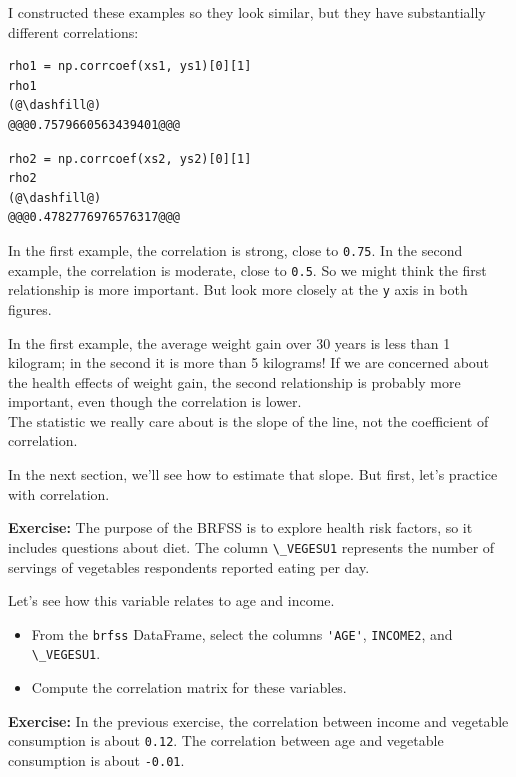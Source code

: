 I constructed these examples so they look similar, but they have
substantially different correlations:

\begin{lstlisting}[]
rho1 = np.corrcoef(xs1, ys1)[0][1]
rho1
(@\dashfill@)
@@@0.7579660563439401@@@
\end{lstlisting}

\begin{lstlisting}[]
rho2 = np.corrcoef(xs2, ys2)[0][1]
rho2
(@\dashfill@)
@@@0.4782776976576317@@@
\end{lstlisting}

In the first example, the correlation is strong, close to
\passthrough{\lstinline!0.75!}. In the second example, the correlation
is moderate, close to \passthrough{\lstinline!0.5!}. So we might think
the first relationship is more important. But look more closely at the
\passthrough{\lstinline!y!} axis in both figures.

In the first example, the average weight gain over 30 years is less than
1 kilogram; in the second it is more than 5 kilograms! If we are
concerned about the health effects of weight gain, the second
relationship is probably more important, even though the correlation is
lower.\\
The statistic we really care about is the slope of the line, not the
coefficient of correlation.

In the next section, we'll see how to estimate that slope. But first,
let's practice with correlation.

\textbf{Exercise:} The purpose of the BRFSS is to explore health risk
factors, so it includes questions about diet. The column
\passthrough{\lstinline!\_VEGESU1!} represents the number of servings of
vegetables respondents reported eating per day.

Let's see how this variable relates to age and income.

\begin{itemize}

\item
  From the \passthrough{\lstinline!brfss!} DataFrame, select the columns
  \passthrough{\lstinline!'AGE'!}, \passthrough{\lstinline!INCOME2!},
  and \passthrough{\lstinline!\_VEGESU1!}.
\item
  Compute the correlation matrix for these variables.
\end{itemize}

\textbf{Exercise:} In the previous exercise, the correlation between
income and vegetable consumption is about
\passthrough{\lstinline!0.12!}. The correlation between age and
vegetable consumption is about \passthrough{\lstinline!-0.01!}.

